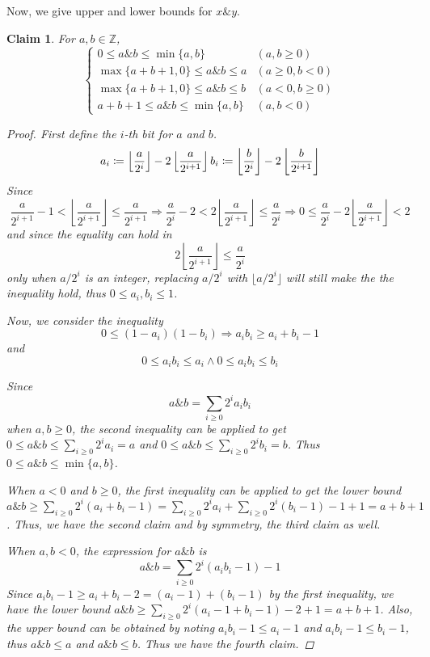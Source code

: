 \documentclass[fleqn]{article}
\newtheorem{clm}{Claim}
\theoremstyle{definition}
\begin{document}
Now, we give upper and lower bounds for $x\& y$.
\begin{clm}
  For $a,b\in\mathbb{Z}$,
  \[
  \begin{cases}
    0\le a\&b \le \min\{a,b\}&(a,b\ge 0)\\
    \max\{a+b+1,0\}\le a\&b \le a&(a\ge 0,b<0)\\
    \max\{a+b+1,0\}\le a\&b \le b&(a<0,b\ge 0)\\
    a+b+1\le a\&b \le\min\{a,b\}&(a,b<0)
  \end{cases}
\]
\begin{proof}
  First define the $i$-th bit for $a$ and $b$.
  \[
    a_{i}\coloneq\left\lfloor\frac{a}{2^{i}}\right\rfloor-2\left\lfloor\frac{a}{2^{i+1}}\right\rfloor\\   b_{i}\coloneq\left\lfloor\frac{b}{2^{i}}\right\rfloor-2\left\lfloor\frac{b}{2^{i+1}}\right\rfloor
  \]
  Since
  \[
    \frac{a}{2^{i+1}}-1<\left\lfloor\frac{a}{2^{i+1}}\right\rfloor\le\frac{a}{2^{i+1}}\Rightarrow\frac{a}{2^{i}}-2<2\left\lfloor\frac{a}{2^{i+1}}\right\rfloor\le\frac{a}{2^{i}}\Rightarrow0\le\frac{a}{2^{i}}-2\left\lfloor\frac{a}{2^{i+1}}\right\rfloor<2
  \]
  and since the equality can hold in
  \[
    2\left\lfloor\frac{a}{2^{i+1}}\right\rfloor\le\frac{a}{2^{i}}
  \]
  only when $a/2^{i}$ is an integer, replacing $a/2^{i}$ with $\lfloor a/2^{i}\rfloor$ will still make the the inequality hold, thus $0\le a_{i},b_{i}\le 1$.

  Now, we consider the inequality
  \begin{equation}
    0\le (1-a_{i})(1-b_{i})\Rightarrow a_{i}b_{i}\ge a_{i}+b_{i}-1
  \end{equation}
  and
  \begin{equation}
    0\le a_{i}b_{i}\le a_{i}\wedge 0\le a_{i}b_{i}\le b_{i}
  \end{equation}

  Since
  \[
    a\&b=\sum_{i\ge0}2^{i}a_{i}b_{i}
  \]
  when $a,b\ge 0$, the second inequality can be applied to get $0\le a\&b\le\sum_{i\ge0}2^{i}a_{i}=a$ and $0\le a\&b\le\sum_{i\ge0}2^{i}b_{i}=b$. Thus $0\le a\&b\le\min\{a,b\}$.

  When $a<0$ and $b\ge 0$, the first inequality can be applied to get the lower bound $a\&b\ge\sum_{i\ge0}2^{i}(a_{i}+b_{i}-1)=\sum_{i\ge0}2^{i}a_{i}+\sum_{i\ge0}2^{i}(b_{i}-1)-1+1=a+b+1$. Thus, we have the second claim and by symmetry, the third claim as well.

  When $a,b<0$, the expression for $a\&b$ is
  \[
    a\&b=\sum_{i\ge0}2^{i}(a_{i}b_{i}-1)-1
  \]
  Since $a_{i}b_{i}-1\ge a_{i}+b_{i}-2=(a_{i}-1)+(b_{i}-1)$ by the first inequality, we have the lower bound $a\&b\ge\sum_{i\ge0}2^{i}(a_{i}-1+b_{i}-1)-2+1=a+b+1$. Also, the upper bound can be obtained by noting $a_{i}b_{i}-1\le a_{i}-1$ and $a_{i}b_{i}-1\le b_{i}-1$, thus $a\&b\le a$ and $a\&b\le b$. Thus we have the fourth claim.
\end{proof}
\end{clm}
\end{document}
